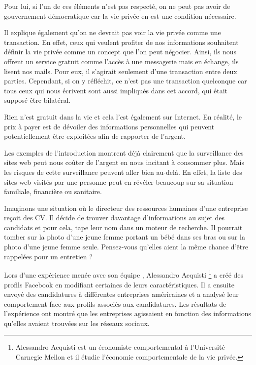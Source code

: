 Pour lui, si l'un de ces éléments n'est pas respecté, on ne peut pas avoir de gouvernement démocratique car la vie privée en est une condition nécessaire.
\newline

Il explique également qu'on ne devrait pas voir la vie privée comme une transaction. En effet, ceux qui veulent profiter de nos informations souhaitent définir la vie privée comme un concept que l'on peut négocier. Ainsi, ils nous offrent un service gratuit comme l'accès à une messagerie mais en échange, ils lisent nos mails. Pour eux, il s'agirait seulement d'une transaction entre deux parties. Cependant, si on y réfléchit, ce n'est pas une transaction quelconque car tous ceux qui nous écrivent sont aussi impliqués dans cet accord, qui était supposé être bilatéral.

Rien n'est gratuit dans la vie et cela l'est également sur Internet. En réalité, le prix à payer est de dévoiler des informations personnelles qui peuvent potentiellement être exploitées afin de rapporter de l'argent.
\newline

Les exemples de l'introduction montrent déjà clairement que la surveillance des sites web peut nous coûter de l'argent en nous incitant à consommer plus. Mais les risques de cette surveillance peuvent aller bien au-delà. En effet, la liste des sites web visités par une personne peut en révéler beaucoup sur sa situation familiale, financière ou sanitaire.
\newline

Imaginons une situation où le directeur des ressources humaines d'une entreprise reçoit des CV. Il décide de trouver davantage d'informations au sujet des candidats et pour cela, tape leur nom dans un moteur de recherche. Il pourrait tomber sur la photo d'une jeune femme portant un bébé dans ses bras ou sur la photo d'une jeune femme seule. Pensez-vous qu'elles aient la même chance d'être rappelées pour un entretien ?

Lors d'une expérience menée avec son équipe \cite{TED_Alessandro_Acquisti}, Alessandro Acquisti \footnote{Alessandro Acquisti est un économiste comportemental à l'Université Carnegie Mellon et il étudie l'économie comportementale de la vie privée.} a créé des profils Facebook en modifiant certaines de leurs caractéristiques. Il a ensuite envoyé des candidatures à différentes entreprises américaines et a analysé leur comportement face aux profils associés aux candidatures. Les résultats de l'expérience ont montré que les entreprises agissaient en fonction des informations qu'elles avaient trouvées sur les réseaux sociaux.
\newline

